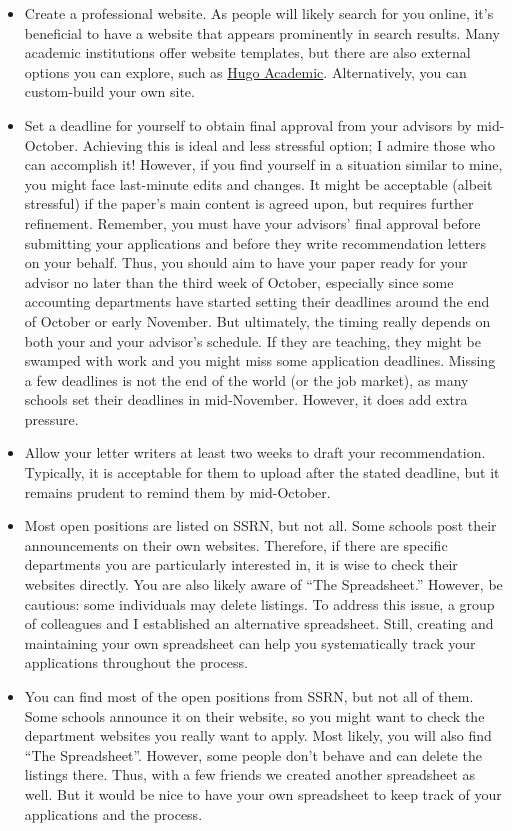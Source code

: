 \documentclass[12pt]{article}
\begin{document}
\begin{itemize}
\item Create a professional website. As people will likely search for you online, it's beneficial to have a website that appears prominently in search results. Many academic institutions offer website templates, but there are also external options you can explore, such as \href{https://github.com/wowchemy/starter-hugo-academic}{Hugo Academic}. Alternatively, you can custom-build your own site.
\item Set a deadline for yourself to obtain final approval from your advisors by mid-October. Achieving this is ideal and less stressful option; I admire those who can accomplish it! However, if you find yourself in a situation similar to mine, you might face last-minute edits and changes. It might be acceptable (albeit stressful) if the paper's main content is agreed upon, but requires further refinement. Remember, you must have your advisors' final approval before submitting your applications and before they write recommendation letters on your behalf. Thus, you should aim to have your paper ready for your advisor no later than the third week of October, especially since some accounting departments have started setting their deadlines around the end of October or early November. But ultimately, the timing really depends on both your and your advisor's schedule. If they are teaching, they might be swamped with work and you might miss some application deadlines. Missing a few deadlines is not the end of the world (or the job market), as many schools set their deadlines in mid-November. However, it does add extra pressure.
\item Allow your letter writers at least two weeks to draft your recommendation. Typically, it is acceptable for them to upload after the stated deadline, but it remains prudent to remind them by mid-October.
\item Most open positions are listed on SSRN, but not all. Some schools post their announcements on their own websites. Therefore, if there are specific departments you are particularly interested in, it is wise to check their websites directly. You are also likely aware of ``The Spreadsheet.'' However, be cautious: some individuals may delete listings. To address this issue, a group of colleagues and I established an alternative spreadsheet. Still, creating and maintaining your own spreadsheet can help you systematically track your applications throughout the process.
\item You can find most of the open positions from SSRN, but not all of them. Some schools announce it on their website, so you might want to check the department websites you really want to apply. Most likely, you will also find ``The Spreadsheet''. However, some people don't behave and can delete the listings there. Thus, with a few friends we created another spreadsheet as well. But it would be nice to have your own spreadsheet to keep track of your applications and the process.

\end{itemize}
\end{document}
